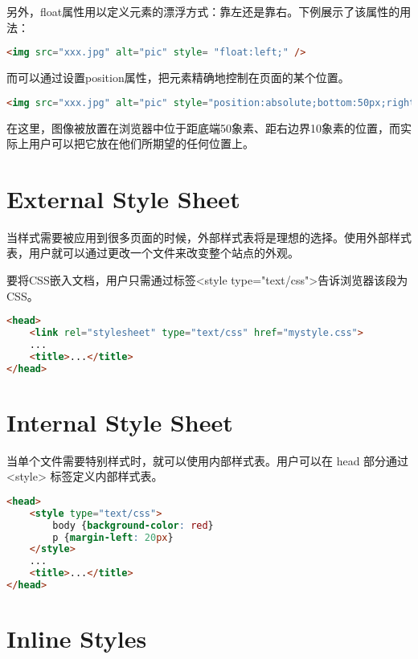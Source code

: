 另外，float属性用以定义元素的漂浮方式：靠左还是靠右。下例展示了该属性的用法：

\begin{lstlisting}[language=HTML]
	<img src="xxx.jpg" alt="pic" style= "float:left;" />
\end{lstlisting}

而可以通过设置position属性，把元素精确地控制在页面的某个位置。

\begin{lstlisting}[language=HTML]
	<img src="xxx.jpg" alt="pic" style="position:absolute;bottom:50px;right:10px;" />
\end{lstlisting}

在这里，图像被放置在浏览器中位于距底端50象素、距右边界10象素的位置，而实际上用户可以把它放在他们所期望的任何位置上。

\section{External Style Sheet}


当样式需要被应用到很多页面的时候，外部样式表将是理想的选择。使用外部样式表，用户就可以通过更改一个文件来改变整个站点的外观。

要将CSS嵌入文档，用户只需通过标签<style type="text/css">告诉浏览器该段为CSS。

\begin{lstlisting}[language=HTML]
<head>
	<link rel="stylesheet" type="text/css" href="mystyle.css">
	...
	<title>...</title>
</head>
\end{lstlisting}




\section{Internal Style Sheet}


当单个文件需要特别样式时，就可以使用内部样式表。用户可以在 head 部分通过 <style> 标签定义内部样式表。


\begin{lstlisting}[language=HTML]
<head>
	<style type="text/css">
		body {background-color: red}
		p {margin-left: 20px}
	</style>
	...
	<title>...</title>
</head>
\end{lstlisting}



\section{Inline Styles}

